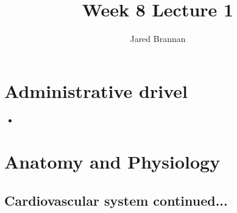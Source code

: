 \documentclass{article}
\title{Week 8 Lecture 1}
\author{Jared Brannan }
\theoremstyle{definition}
\begin{document}
\maketitle

\section{Administrative drivel}
\begin{itemize}
	\item
\end{itemize}

\section{Anatomy and Physiology}

\subsection{Cardiovascular system continued...}
\end{document}
